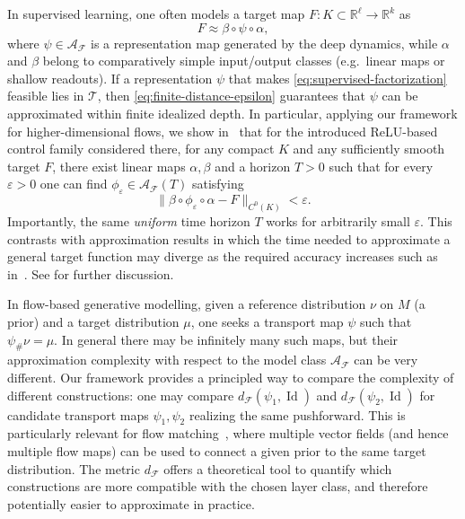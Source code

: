 \documentclass[12pt]{amsart}
\numberwithin{equation}{section}
\theoremstyle{remark}
\begin{document}
In supervised learning, one often models a target map $F:K\subset\mathbb{R}^\ell\to\mathbb{R}^k$ as
\begin{equation}
F \approx \beta \circ \psi\circ \alpha,
\label{eq:supervised-factorization}
\end{equation}
where $\psi\in\mathcal A_{\mathcal F}$ is a representation map generated by the deep dynamics, while
$\alpha$ and $\beta$ belong to comparatively simple input/output classes (e.g.\ linear maps or shallow readouts).
If a representation $\psi$ that makes \eqref{eq:supervised-factorization} feasible lies in $\mathcal T$, then
\eqref{eq:finite-distance-epsilon} guarantees that $\psi$ can be approximated within finite idealized depth.
In particular, applying our framework for higher-dimensional flows, we show in~
that for the introduced ReLU-based control family considered there, for any compact $K$ and any sufficiently smooth target
$F$, there exist linear maps $\alpha,\beta$ and a horizon $T>0$ such that for every $\varepsilon>0$ one can find
$\phi_\varepsilon\in\mathcal A_{\mathcal F}(T)$ satisfying
\begin{equation}
\|\beta\circ \phi_\varepsilon\circ \alpha - F\|_{C^0(K)}<\varepsilon.
\end{equation}
Importantly, the same \emph{uniform} time horizon $T$ works for arbitrarily small $\varepsilon$.
This contrasts with approximation results in which the time needed to approximate a general target function may
diverge as the required accuracy increases such as in~\cite{cheng2025interpolation,li2022deep}. See
 for further discussion.

In flow-based generative modelling, given a reference distribution $\nu$ on $M$ (a prior) and a target
distribution $\mu$, one seeks a transport map $\psi$ such that $\psi_\#\nu=\mu$. In general there may be
infinitely many such maps, but their approximation complexity with respect to the model class
$\mathcal A_{\mathcal F}$ can be very different. Our framework provides a principled way to compare the
complexity of different constructions: one may compare $d_{\mathcal F}(\psi_1,\operatorname{Id})$ and
$d_{\mathcal F}(\psi_2,\operatorname{Id})$ for candidate transport maps $\psi_1,\psi_2$ realizing the same
pushforward. This is particularly relevant for flow matching~\cite{lipman2022flowmatching}, where multiple
vector fields (and hence multiple flow maps) can be used to connect a given prior to the same target
distribution. The metric $d_{\mathcal F}$ offers a theoretical tool to quantify which constructions are more
compatible with the chosen layer class, and therefore potentially easier to approximate in practice.
\end{document}
